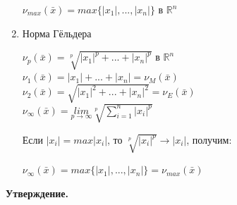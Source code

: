 \documentclass[12pt]{article}
\theoremstyle{definition}
\numberwithin{equation}{section}
\begin{document}
\begin{enumerate}
\begin{center}
$\nu_{max}(\bar x) = max\{|x_1|,...,|x_n|\}$ в $\mathbb{R}^n$\\\end{center}
\item Норма Гёльдера
\begin{center}$\nu_p(\bar x) = \sqrt[p]{|x_1|^p+...+|x_n|^p}$ в $\mathbb{R}^n$\\
$\nu_1(\bar x) = |x_1|+...+|x_n| = \nu_M(\bar x)$\\ 
$\nu_2(\bar x) = \sqrt{|x_1|^2+...+|x_n|^2} = \nu_E(\bar x)$\\
$\nu_{\infty}(\bar x) = \underset{p \to \infty}{lim}\sqrt[p]{\sum\limits_{i=1}^n |x_i|^p}$\end{center}
Если $|x_i| = max |x_i|$, то $\sqrt[p]{|x_i|^p} \to |x_i|$, получим:
\begin{center}$\nu_{\infty}(\bar x) = max \{|x_1|,...,|x_n|\} = \nu_{max}(\bar x)$\end{center}
\end{enumerate}
\textbf{Утверждение.}
\end{document}

